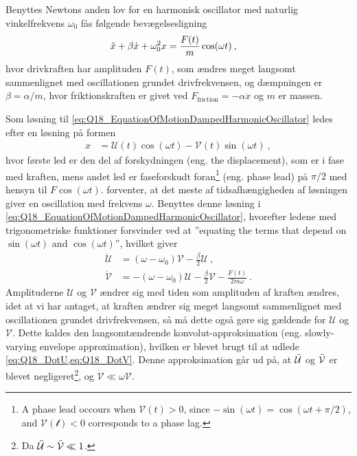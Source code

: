 Benyttes Newtons anden lov for en harmonisk oscillator med naturlig vinkelfrekvens $\omega_0$ fås følgende bevægelsesligning
\begin{align} \label{eq:Q18_EquationOfMotionDampedHarmonicOscillator}
    \Ddot{x} + \beta \Dot{x} + \omega_0^2 x &= \frac{F(t)}{m}\cos(\omega t) \: ,
\end{align}
hvor drivkraften har amplituden $F(t)$, som ændres meget langsomt sammenlignet med oscillationen grundet drivfrekvensen, og dæmpningen er $\beta = \alpha/m$, hvor friktionskraften er givet ved $F_\text{friction} = -\alpha\Dot{x}$ og $m$ er massen.

Som løsning til \cref{eq:Q18_EquationOfMotionDampedHarmonicOscillator} ledes efter en løsning på formen
\begin{align} \label{eq:Q18_FormOfTheSolution}
    x &= \mathcal{U}(t)\cos(\omega t) - \mathcal{V}(t)\sin(\omega t) \: ,
\end{align}
hvor første led er den del af forskydningen (eng. the displacement), som er i fase med kraften, mens andet led er faseforskudt foran\footnote{A phase lead occours when $\mathcal{V}(t) > 0$, since $-\sin(\omega t) = \cos(\omega t + \pi/2)$, and $\mathcal{V(t) < 0}$ corresponds to a phase lag.} (eng. phase lead) på $\pi/2$ med hensyn til $F\cos(\omega t)$.  forventer, at det meste af tidsafhængigheden af løsningen giver en oscillation med frekvens $\omega$. Benyttes denne løsning i \cref{eq:Q18_EquationOfMotionDampedHarmonicOscillator}, hvorefter ledene med trigonometriske funktioner forsvinder ved at ''equating the terms that depend on $\sin(\omega t)$ and $\cos(\omega t)$'', hvilket giver
\begin{align}
    \Dot{\mathcal{U}} &= (\omega - \omega_0)\mathcal{V} - \frac{\beta}{2}\mathcal{U} \: , \label{eq:Q18_DotU} \\
    \Dot{\mathcal{V}} &= -(\omega - \omega_0)\mathcal{U} - \frac{\beta}{2}\mathcal{V} - \frac{F(t)}{2m\omega} \: . \label{eq:Q18_DotV}
\end{align}
Amplituderne $\mathcal{U}$ og $\mathcal{V}$ ændrer sig med tiden som amplituden af kraften ændres, idet at vi har antaget, at kraften ændrer sig meget langsomt sammenlignet med oscillationen grundet drivfrekvensen, så må dette også gøre sig gældende for $\mathcal{U}$ og $\mathcal{V}$. Dette kaldes den \textsf{langsomtændrende konvolut-approksimation} (eng. slowly-varying envelope approximation), hvilken er blevet brugt til at udlede \cref{eq:Q18_DotU,eq:Q18_DotV}. Denne approksimation går ud på, at $\Ddot{\mathcal{U}}$ og $\Ddot{\mathcal{V}}$ er blevet negligeret\footnote{Da $\Ddot{\mathcal{U}} \sim \Ddot{\mathcal{V}} \ll 1$.}, og $\Dot{\mathcal{V}} \ll \omega \mathcal{V}$.

